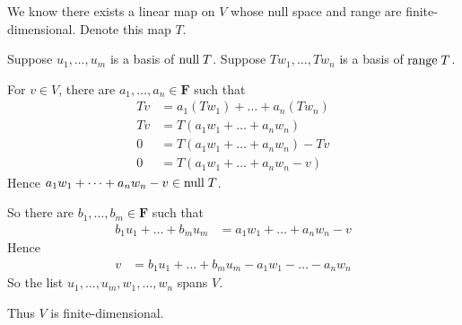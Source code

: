 \documentclass[a5paper]{article}
\begin{document}
\newcommand    \C          {\mathbf{C}}
\newcommand    \R          {\mathbf{R}}
\renewcommand  \L          {\mathcal{L}}
\newcommand    \F          {\mathbf{F}}
\renewcommand  \P          {\mathcal{P}}
\newcommand    \nullspace  {\text{null\;}}
\newcommand    \range      {\text{range\;}}
\newcommand    \linspan    {\text{span\;}}

    We know there exists a linear map on $V$ whose null space and range are finite-dimensional.
    Denote this map $T$.

    Suppose $u_1,\dots,u_m$ is a basis of $\nullspace T$.
    Suppose $Tw_1,\dots,Tw_n$ is a basis of $\range T$.

    For $v \in V$, there are $a_1,\dots,a_n \in \F$ such that
\begin{align*}
        Tv &= a_1(Tw_1) + \dots + a_n(Tw_n)     \\
        Tv &= T(a_1w_1 + \dots + a_nw_n) \\
        0 &= T(a_1w_1 + \dots + a_nw_n) - Tv \\
        0 &= T(a_1w_1 + \dots + a_nw_n - v) 
\end{align*}
    Hence $a_1w_1 + \dots + a_nw_n - v \in \nullspace T$.

    So there are $b_1,\dots,b_m \in \F$ such that
\begin{align*}
        b_1u_1 + \dots + b_mu_m &= a_1w_1 + \dots + a_nw_n - v 
\end{align*}
    Hence
\begin{align*}
        v &= b_1u_1 + \dots + b_mu_m - a_1w_1 - \dots - a_nw_n
\end{align*}
    So the list $u_1,\dots,u_m,w_1,\dots,w_n$ spans $V$.

    Thus $V$ is finite-dimensional.
\end{document}
